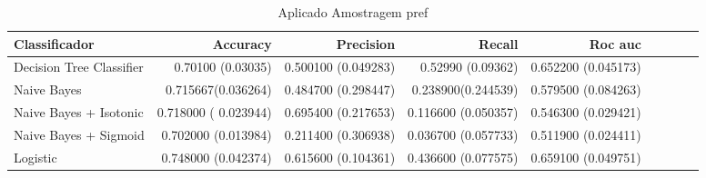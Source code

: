 \begin{table}
\centering
\caption{Aplicado Amostragem pref}
\label{Aplicado Amostragem pref 2}
\begin{tabular}{lrrrrrrrl}
\toprule
Classificador            &   Accuracy               &  Precision              &  Recall                  &   Roc auc \\
\midrule
Decision Tree Classifier &   0.70100 (0.03035)     &      0.500100 (0.049283)   &  0.52990 (0.09362)       &  0.652200 (0.045173)  \\
Naive Bayes              &   0.715667(0.036264)      &       0.484700 (0.298447) &    0.238900(0.244539) &  0.579500 (0.084263)  \\
Naive Bayes + Isotonic   &   0.718000 ( 0.023944) &       0.695400 (0.217653) &   0.116600 (0.050357) & 0.546300 (0.029421)  \\
Naive Bayes + Sigmoid    &    0.702000 (0.013984) &       0.211400 (0.306938) &    0.036700 (0.057733) & 0.511900 (0.024411)  \\
Logistic                 &  0.748000 (0.042374) &      0.615600 (0.104361) &    0.436600 (0.077575) & 0.659100 (0.049751)  \\
\bottomrule
\end{tabular}
\end{table}
